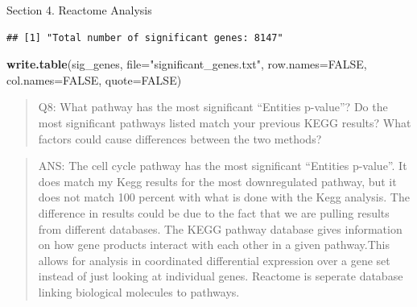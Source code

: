 \documentclass[
]{article}
\newenvironment{Shaded}{\begin{snugshade}}{\end{snugshade}}
\newcommand{\AttributeTok}[1]{\textcolor[rgb]{0.13,0.29,0.53}{#1}}
\newcommand{\ConstantTok}[1]{\textcolor[rgb]{0.56,0.35,0.01}{#1}}
\newcommand{\FloatTok}[1]{\textcolor[rgb]{0.00,0.00,0.81}{#1}}
\newcommand{\FunctionTok}[1]{\textcolor[rgb]{0.13,0.29,0.53}{\textbf{#1}}}
\newcommand{\NormalTok}[1]{#1}
\newcommand{\OtherTok}[1]{\textcolor[rgb]{0.56,0.35,0.01}{#1}}
\newcommand{\SpecialCharTok}[1]{\textcolor[rgb]{0.81,0.36,0.00}{\textbf{#1}}}
\newcommand{\StringTok}[1]{\textcolor[rgb]{0.31,0.60,0.02}{#1}}
\begin{document}
Section 4. Reactome Analysis

\begin{Shaded}
\end{Shaded}

\begin{verbatim}
## [1] "Total number of significant genes: 8147"
\end{verbatim}

\begin{Shaded}
\begin{Highlighting}[]
\FunctionTok{write.table}\NormalTok{(sig\_genes, }\AttributeTok{file=}\StringTok{"significant\_genes.txt"}\NormalTok{, }\AttributeTok{row.names=}\ConstantTok{FALSE}\NormalTok{, }\AttributeTok{col.names=}\ConstantTok{FALSE}\NormalTok{, }\AttributeTok{quote=}\ConstantTok{FALSE}\NormalTok{)}
\end{Highlighting}
\end{Shaded}

\begin{quote}
Q8: What pathway has the most significant ``Entities p-value''? Do the
most significant pathways listed match your previous KEGG results? What
factors could cause differences between the two methods?
\end{quote}

\begin{quote}
ANS: The cell cycle pathway has the most significant ``Entities
p-value''. It does match my Kegg results for the most downregulated
pathway, but it does not match 100 percent with what is done with the
Kegg analysis. The difference in results could be due to the fact that
we are pulling results from different databases. The KEGG pathway
database gives information on how gene products interact with each other
in a given pathway.This allows for analysis in coordinated differential
expression over a gene set instead of just looking at individual genes.
Reactome is seperate database linking biological molecules to pathways.
\end{quote}
\end{document}
